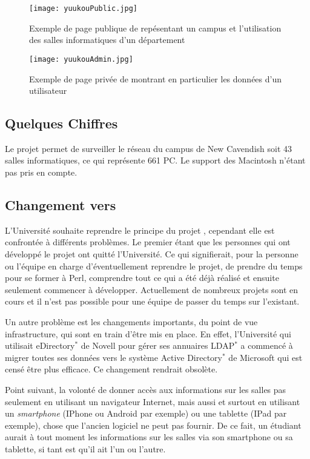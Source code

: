 \begin{figure}[!ht]
	\centering
	\texttt{[image: yuukouPublic.jpg]}
	\caption{Exemple de page publique de \Yuukou{} rep\'esentant un campus et l'utilisation des salles informatiques d'un d\'epartement}
	\label{figure:yuukouPublic}

\end{figure}

\begin{figure}[!ht]
	\centering
	\texttt{[image: yuukouAdmin.jpg]}
	\caption{Exemple de page priv\'ee de \Yuukou{} montrant en particulier les donn\'ees d'un utilisateur}
	\label{figure:yuukouAdmin}

\end{figure}

\subsection{Quelques Chiffres}

Le projet \Yuukou{} permet de surveiller le r\'eseau du campus de New Cavendish soit 43 salles informatiques, ce qui repr\'esente 661 PC. 
Le support des Macintosh n'\'etant pas pris en compte.

\subsection{Changement vers \YuukouII}

L'Universit\'e souhaite reprendre le principe du projet \Yuukou, cependant elle est confront\'ee \`a diff\'erents probl\`emes.
Le premier \'etant que les personnes qui ont d\'evelopp\'e le projet ont quitt\'e l'Universit\'e. 
Ce qui signifierait, pour la personne ou l'\'equipe en charge d'\'eventuellement reprendre le projet, de prendre du temps pour se former \`a Perl, comprendre tout ce qui a \'et\'e d\'ej\`a r\'ealis\'e et ensuite seulement commencer \`a d\'evelopper.
Actuellement de nombreux projets sont en cours et il n'est pas possible pour une \'equipe de passer du temps sur l'existant.

Un autre probl\`eme est les changements importants, du point de vue infrastructure, qui sont en train d'\^etre mis en place.
En effet, l'Universit\'e qui utilisait eDirectory$^*$ de Novell pour g\'erer ses annuaires LDAP$^*$ a commenc\'e \`a migrer toutes ses donn\'ees vers le syst\`eme Active Directory$^*$ de Microsoft qui est cens\'e \^etre plus efficace. Ce changement rendrait \Yuukou{} obsol\`ete.

Point suivant, la volont\'e de donner acc\`es aux informations sur les salles pas seulement en utilisant un navigateur Internet, mais aussi et surtout en utilisant un \textit{smartphone} (IPhone ou Android par exemple) ou une tablette (IPad par exemple), chose que l'ancien logiciel ne peut pas fournir.
De ce fait, un \'etudiant aurait \`a tout moment les informations sur les salles via son smartphone ou sa tablette, si tant est qu'il ait l'un ou l'autre.

